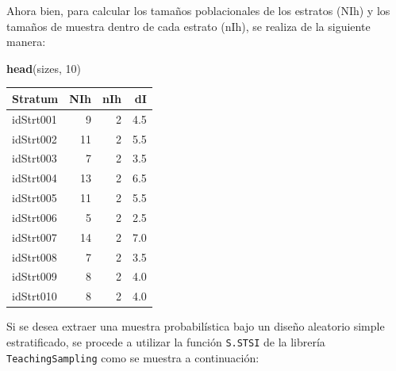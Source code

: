 \documentclass[
  spanish,
  12pt,
]{book}
\newenvironment{Shaded}{\begin{snugshade}}{\end{snugshade}}
\newcommand{\AttributeTok}[1]{\textcolor[rgb]{0.13,0.29,0.53}{#1}}
\newcommand{\DecValTok}[1]{\textcolor[rgb]{0.00,0.00,0.81}{#1}}
\newcommand{\FunctionTok}[1]{\textcolor[rgb]{0.13,0.29,0.53}{\textbf{#1}}}
\newcommand{\NormalTok}[1]{#1}
\newcommand{\OtherTok}[1]{\textcolor[rgb]{0.56,0.35,0.01}{#1}}
\newcommand{\SpecialCharTok}[1]{\textcolor[rgb]{0.81,0.36,0.00}{\textbf{#1}}}
\begin{document}
Ahora bien, para calcular los tamaños poblacionales de los estratos (NIh) y los tamaños de muestra dentro de cada estrato (nIh), se realiza de la siguiente manera:

\begin{Shaded}
\end{Shaded}

\begin{Shaded}
\begin{Highlighting}[]
\FunctionTok{head}\NormalTok{(sizes, }\DecValTok{10}\NormalTok{)}
\end{Highlighting}
\end{Shaded}

\begin{tabular}{l|r|r|r}
\hline
Stratum & NIh & nIh & dI\\
\hline
idStrt001 & 9 & 2 & 4.5\\
\hline
idStrt002 & 11 & 2 & 5.5\\
\hline
idStrt003 & 7 & 2 & 3.5\\
\hline
idStrt004 & 13 & 2 & 6.5\\
\hline
idStrt005 & 11 & 2 & 5.5\\
\hline
idStrt006 & 5 & 2 & 2.5\\
\hline
idStrt007 & 14 & 2 & 7.0\\
\hline
idStrt008 & 7 & 2 & 3.5\\
\hline
idStrt009 & 8 & 2 & 4.0\\
\hline
idStrt010 & 8 & 2 & 4.0\\
\hline
\end{tabular}

Si se desea extraer una muestra probabilística bajo un diseño aleatorio simple estratificado, se procede a utilizar la función \texttt{S.STSI} de la librería \texttt{TeachingSampling} como se muestra a continuación:
\end{document}
